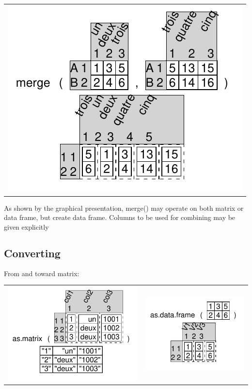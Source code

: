 \documentclass[pdflatex]{article}
\begin{document}
\begin{tabular}{c}
\includegraphics{merge.pdf}
\end{tabular}

As shown by the graphical presentation, merge() may operate on both matrix or
data frame, but create data frame. Columns to be used for combining may be
given explicitly

\subsection{Converting}

From and toward matrix:

\begin{tabular}{cc}
\includegraphics{dataframe_as_matrix} & \includegraphics{dataframe_as_data_frame}\\
\end{tabular}
\end{document}
